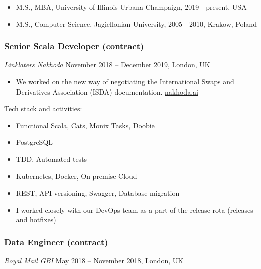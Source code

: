 \documentclass[]{rss}
\providecommand{\tightlist}{%
  \setlength{\itemsep}{0pt}\setlength{\parskip}{0pt}}
\begin{document}
\begin{resume}
\begin{itemize}
\tightlist
\item
  M.S., MBA, University of Illinois Urbana-Champaign, 2019 - present,
  USA
\item
  M.S., Computer Science, Jagiellonian University, 2005 - 2010, Krakow,
  Poland
\end{itemize}

\hypertarget{senior-scala-developer-contract}{%
\subsubsection{Senior Scala Developer
(contract)}\label{senior-scala-developer-contract}}

\emph{Linklaters \textbar{} Nakhoda} November 2018 -- December 2019,
London, UK

\begin{itemize}
\tightlist
\item
  We worked on the new way of negotiating the International Swaps and
  Derivatives Association (ISDA) documentation.
  \href{https://nakhoda.ai}{nakhoda.ai}
\end{itemize}

Tech stack and activities:

\begin{itemize}
\tightlist
\item
  Functional Scala, Cats, Monix Tasks, Doobie
\item
  PostgreSQL
\item
  TDD, Automated tests
\item
  Kubernetes, Docker, On-premise Cloud
\item
  REST, API versioning, Swagger, Database migration
\item
  I worked closely with our DevOps team as a part of the release rota
  (releases and hotfixes)
\end{itemize}

\hypertarget{data-engineer-contract}{%
\subsubsection{Data Engineer (contract)}\label{data-engineer-contract}}

\emph{Royal Mail \textbar{} GBI} May 2018 -- November 2018, London, UK


\end{resume}
\end{document}
